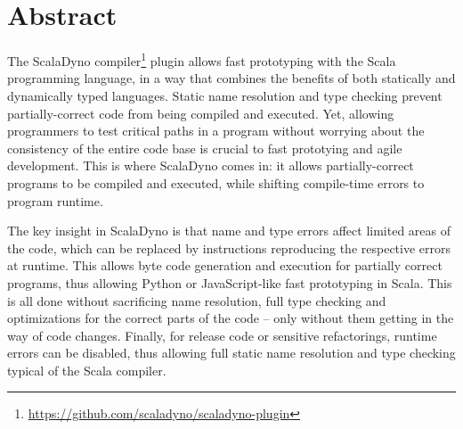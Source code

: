 \section{Abstract}





The ScalaDyno compiler\footnote{\url{https://github.com/scaladyno/scaladyno-plugin}} plugin allows fast prototyping with the Scala programming language, in a way that combines the benefits of both statically and dynamically typed languages. Static name resolution and type checking prevent partially-correct code from being compiled and executed. Yet, allowing programmers to test critical paths in a program without worrying about the consistency of the entire code base is crucial to fast prototying and agile development. This is where ScalaDyno comes in: it allows partially-correct programs to be compiled and executed, while shifting compile-time errors to program runtime.

The key insight in ScalaDyno is that name and type errors affect limited areas of the code, which can be replaced by instructions reproducing the respective errors at runtime. This allows byte code generation and execution for partially correct programs, thus allowing Python or JavaScript-like fast prototyping in Scala. This is all done without sacrificing name resolution, full type checking and optimizations for the correct parts of the code -- only without them getting in the way of code changes. Finally, for release code or sensitive refactorings, runtime errors can be disabled, thus allowing full static name resolution and type checking typical of the Scala compiler.


